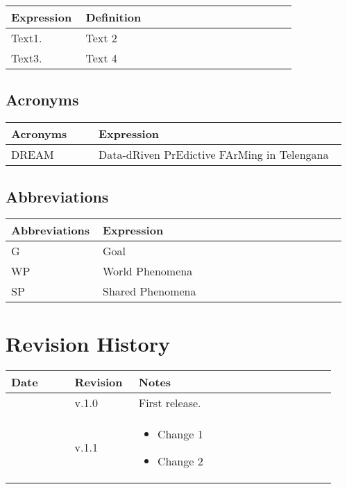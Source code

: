 \begin{center}
	\begin{tabular}{@{}p{0.25\linewidth} p{0.71\linewidth}@{}}
		\toprule
		\textbf{Expression} & \textbf{Definition}\\
		\midrule
		Text1. & Text 2\\
        Text3. & Text 4\\
	\end{tabular}
\end{center}

\subsection{Acronyms}

\begin{center}
	\begin{tabular}{@{}p{0.25\linewidth} p{0.71\linewidth}@{}}
		\toprule
		\textbf{Acronyms} & \textbf{Expression}\\
		\midrule
		DREAM & Data-dRiven PrEdictive FArMing in Telengana\\
		\bottomrule
	\end{tabular}
\end{center}

\subsection{Abbreviations}
\begin{center}
	\begin{tabular}{@{}p{0.25\linewidth} p{0.71\linewidth}@{}}
		\toprule
		\textbf{Abbreviations} & \textbf{Expression}\\
		\midrule
		G & Goal\\
		WP & World Phenomena\\
		SP & Shared Phenomena\\
		\bottomrule
	\end{tabular}
\end{center}

\section{Revision History}

\begin{center}
	\begin{tabular}{@{}p{0.18\linewidth} p{0.18\linewidth} p{0.57\linewidth}@{}}
		\toprule
		\textbf{Date} & \textbf{Revision} & \textbf{Notes}\\
		\midrule
		\date{} & v.1.0 & First release.\\
		\date{} & v.1.1 & \begin{itemize}[label={--},leftmargin=.4cm,noitemsep,topsep=0pt,before=\vspace{-3.5mm},after=\vspace{-4mm}]
			\item Change 1
			\item Change 2
		\end{itemize}\\
		\bottomrule
	\end{tabular}
\end{center}

